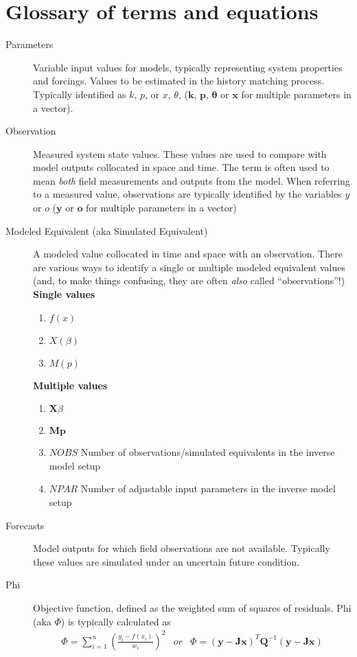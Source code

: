 \documentclass[english]{article}
\begin{document}
\section*{Glossary of terms and equations}
\begin{description}
\item [Parameters] Variable input values for models, typically representing system properties and forcings. Values to be estimated in the history matching process. Typically identified as $k$, $p$, or $x$, $\theta$, ($\mathbf{k}$, $\mathbf{p}$, $\boldsymbol{\theta}$ or $\mathbf{x}$ for multiple parameters in a vector).
\item [Observation] Measured system state values. These values are used to compare with model outputs collocated in space and time. The term is often used to mean \emph{both} field measurements and outputs from the model. When referring to a measured value, observations are typically identified by the variables $y$ or $o$  ($\mathbf{y}$ or $\mathbf{o}$ for multiple parameters in a vector)
\item [Modeled Equivalent (aka Simulated Equivalent)] A modeled value collocated in time and space with an observation. There are various ways to identify a single or multiple modeled equivalent values (and, to make things confusing, they are often \emph{also} called ``observations''!)  \newline{}
\textbf{Single values} 
\begin{enumerate}
\item $f\left(x\right)$
\item $X\left(\beta\right)$
\item $M\left(p\right)$
\end{enumerate}
\textbf{Multiple values}
\begin{enumerate}
\item $\mathbf{X}\beta$
\item $\mathbf{M}\mathbf{p}$
\item ${NOBS}$ Number of observations/simulated equivalents in the inverse model setup
\item ${NPAR}$ Number of adjustable input parameters in the inverse model setup

\end{enumerate}
\item [Forecasts] Model outputs for which field observations are not available. Typically these values are simulated under an uncertain future condition.
\item [Phi] Objective function, defined as the weighted sum of squares of residuals. Phi (aka $\Phi$) is typically calculated as
\begin{equation}
\begin{array}{ccc}
 \Phi=\sum_{i=1}^{n}\left(\frac{y_{i}-f\left(x_{i}\right)}{w_{i}}\right)^{2} & or & \Phi=\left(\mathbf{y}-\mathbf{Jx}\right)^{T}\mathbf{Q}^{-1}\left(\mathbf{y}-\mathbf{Jx}\right)
 \end{array}
\end{equation}


\end{description}
\end{document}
